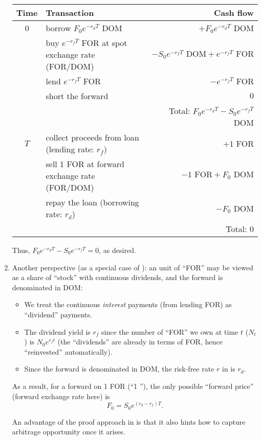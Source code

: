 \begin{enumerate}
\begin{pf}
\begin{center}
\begin{tabular}{clr}
\toprule
Time&Transaction&Cash flow\\
\midrule
0&borrow \(F_0e^{-r_dT}\) DOM &\(+F_0e^{-r_dT}\) DOM\\
&buy \(e^{-r_fT}\) FOR at spot exchange rate (FOR/DOM) &\(-S_0e^{-r_fT}\text{ DOM} + e^{-r_fT}\text{ FOR}\)\\
&lend \(e^{-r_fT}\) FOR&\(-e^{-r_fT}\) FOR\\
&short the forward&\(0\)\\
&&Total: \(F_0e^{-r_dT}-S_0e^{-r_fT}\) DOM\\
\midrule
\(T\)&collect proceeds from loan (lending rate: \(r_f\))& \(+1\) FOR \\
&sell 1 FOR at forward exchange rate (FOR/DOM) & \(-1\text{ FOR}+F_0\text{ DOM}\) \\
&repay the loan (borrowing rate: \(r_d\))& \(-F_0\) DOM \\
&&Total: \(0\)\\
\bottomrule
\end{tabular}
\end{center}
Thus, \(F_0e^{-r_dT}-S_0e^{-r_fT}=0\), as desired.
\end{pf}

\item Another perspective (as a special case of
): an unit of ``FOR'' may be viewed
as a share of ``stock'' with continuous dividends, and the forward is
denominated in DOM:
\begin{itemize}
\item We treat the continuous \emph{interest} payments (from lending FOR) as
``dividend'' payments.
\item The dividend yield is \(r_f\) since the number of ``FOR'' we own at time
\(t\) (\(N_t\)) is \(N_0 e^{r_ft}\) (the ``dividends'' are already in terms of
FOR, hence ``reinvested'' automatically).
\item Since the forward is denominated in DOM, the risk-free rate \(r\) in
 is \(r_d\).
\end{itemize}
As a result, for a forward on 1 FOR (``1 ''), the only
possible ``forward price'' (forward exchange rate here) is
\[
F_0=S_0e^{(r_d-r_f)T}.
\]
\begin{note}
An advantage of the proof approach in  is
that it also hints how to capture arbitrage opportunity once it arises.
\end{note}
\end{enumerate}

